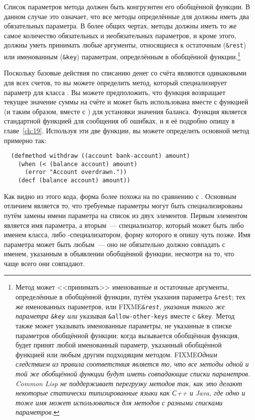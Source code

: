 Список параметров метода должен быть конгруэнтен его обобщённой функции.  В данном случае
это означает, что все методы определённые для  должны иметь два
обязательных параметра.  В более общих чертах, методы должны иметь то же самое количество
обязательных и необязательных параметров, и кроме этого, должны уметь принимать любые
аргументы, относящиеся к остаточным (\lstinline!&rest!) или именованным (\lstinline!&key!)
параметрам, определённым в обобщённой функции.\footnote{Метод может <<принимать>>
  именованные и остаточные аргументы, определённые в обобщённой функции, путём указания
  параметра \lstinline!&rest!; тех же именованных параметров, или
  FIXME\textit{\lstinline!&rest!, указания такого же параметра \lstinline!&key! или}
  указывая \lstinline!&allow-other-keys! вместе с \lstinline!&key!.  Метод также может
  указывать именованные параметры, не указанные в списке параметров обобщённой функции:
  когда вызывается обобщённая функция, будет принят любой именованный параметр, указанный
  обобщённой функцией или любым другим подходящим методом.  FIXME\textit{Одним следствием
    из правила соответствия является то, что все методы одной и той же обобщённой функции
    будут иметь совпадающие списки параметров.  Common Lisp не поддерживает перегрузку
    методов так, как это делают некоторые статически типизированные языки как С++ и Java,
    где одно и тоже имя может использоваться для методов с разными списками параметров.}
}

Поскольку базовые действия по списанию денег со счёта являются одинаковыми для всех
счетов, то вы можете определить метод, который специализирует параметр  для
класса .  Вы можете предположить, что функция  возвращает
текущее значение суммы на счёте и может быть использована вместе с функцией  (и
таким образом, вместе с ) для установки значения баланса.  Функция 
является стандартной функцией для сообщения об ошибках, и я её подробно опишу в
главе~\ref{ch:19}.  Используя эти две функции, вы можете определить основной метод
 примерно так:

\begin{lstlisting}
  (defmethod withdraw ((account bank-account) amount)
    (when (< (balance account) amount)
      (error "Account overdrawn."))
    (decf (balance account) amount))
\end{lstlisting}

Как видно из этого кода, форма  более похожа на  по сравнению
с .  Основным отличием является то, что требуемые параметры могут быть
специализированы путём замены имени параметра на список из двух элементов.  Первым
элементом является имя параметра, а вторым~--- специализатор, который может быть либо
именем класса, либо -специализатором, форму которого я опишу чуть позже.  Имя
параметра может быть любым~--- оно не обязательно должно совпадать с именем, указанным в
объявлении обобщённой функции, несмотря на то, что чаще всего они совпадают.

